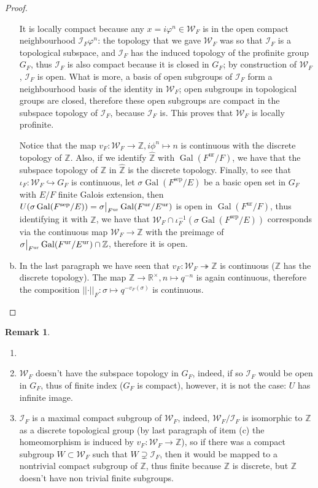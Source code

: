 \documentclass[12pt]{article}
\theoremstyle{plain}
\theoremstyle{definition}
\newtheorem{remark}[theorem]{Remark}
\newcommand{\integers}{\mathbb{Z}}
\newcommand{\reals}{\mathbb{R}}
\newcommand{\Abs}[1]{\left \vert \left \vert #1 \right \vert \right \vert}
\renewcommand{\hat}[1]{\widehat{#1}}
\newcommand\rest[2]{{%
  \left.\kern-\nulldelimiterspace %
  #1 %
  \vphantom{\big|} %
  \right|_{#2} %
  }}
\newcommand{\Gal}[2]{\operatorname{Gal} ( #1 / #2 )}
\newcommand{\sep}[1]{{#1}^{\operatorname{sep}}}
\newcommand{\ur}[1]{{#1}^{\operatorname{ur}}}
\newcommand{\inercia}[1]{\mathcal I_{#1}}
\newcommand{\weil}[1]{\mathcal W_{#1}}
\begin{document}
\begin{proof}
\begin{enumerate}[(a)]
It is locally compact because any $x = i \varphi^n \in \weil F$ is in the open compact neighbourhood $\inercia F \varphi^n$: the topology that we gave $\weil F$ was so that $\inercia F$ is a topological subspace, and $\inercia F$ has the induced topology of the profinite group $G_F$, thus $\inercia F$ is also compact because it is closed in $G_F$; by construction of $\weil F$, $\inercia F$ is open. What is more, a basis of open subgroups of $\inercia F$ form a neighbourhood basis of the identity in $\weil F$; open subgroups in topological groups are closed, therefore these open subgroups are compact in the subspace topology of $\inercia F$, because $\inercia F$ is. This proves that $\weil F$ is locally profinite.

Notice that the map $v_F : \weil F \to \integers, i \phi^n \mapsto n$ is continuous with the discrete topology of $\integers$. Also, if we identify $\hat \integers$ with $\Gal {\ur F} F$, we have that the subspace topology of $\integers$ in $\hat \integers$ is the discrete topology.
Finally, to see that $\iota_F : \weil F \hookrightarrow G_F$ is continuous, let $\sigma \Gal {\sep F} E$ be a basic open set in $G_F$ with $E/F$ finite Galois extension, then $U(\sigma \Gal {\sep F} E) = \rest{\sigma}{\ur F} \Gal {\ur F} {\ur E}$ is open in $\Gal {\ur F} F$, thus identifying it with $\hat \integers$, we have that $\weil F \cap \iota_F ^{-1} (\sigma \Gal {\sep F} E)$ corresponds via the continuous map $\weil F \to \integers$ with the preimage of $\rest{\sigma}{\ur F} \Gal {\ur F} {\ur E} \cap \integers$, therefore it is open.
\item In the last paragraph we have seen that $v_F : \weil F \twoheadrightarrow \integers$ is continuous ($\integers$ has the discrete topology). The map $\integers \to \reals^\times, n \mapsto q^{-n}$ is again continuous, therefore the composition $\Abs \cdot _F : \sigma \mapsto q^{-v_F (\sigma)}$ is continuous.
\end{enumerate}
\end{proof}

\begin{remark}
\begin{enumerate}
\item[]
\item $\weil F$ doesn't have the subspace topology in $G_F$, indeed, if so $\inercia F$ would be open in $G_F$, thus of finite index ($G_F$ is compact), however, it is not the case: $U$ has infinite image.

\item $\inercia F$ is a maximal compact subgroup of $\weil F$, indeed, $\weil F / \inercia F$ is isomorphic to $\mathbb Z$ as a discrete topological group (by last paragraph of item (c) the homeomorphism is induced by $v_F : \weil F \to \integers$), so if there was a compact subgroup $W\subset \weil F$ such that $W \supsetneq \inercia F$, then it would be mapped to a nontrivial compact subgroup of $\integers$, thus finite because $\integers$ is discrete, but $\integers$ doesn't have non trivial finite subgroups.
\end{enumerate}
\end{remark}
\end{document}

